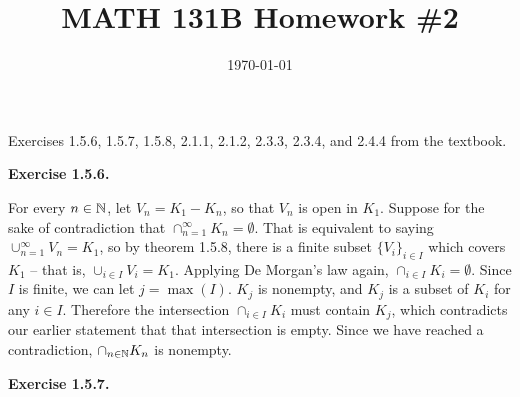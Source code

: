 \documentclass{article}
\date{\today}
\title{MATH 131B Homework \#2}
\begin{document}
\maketitle

\begin{prob}
    Exercises 1.5.6, 1.5.7, 1.5.8, 2.1.1, 2.1.2, 2.3.3, 2.3.4, and 2.4.4 from the textbook.
\end{prob}
\textbf{Exercise 1.5.6.}
\par
For every $n \in \mathbb{N}$, let $V_n = K_1 - K_n$, so that $V_n$ is open in $K_1$. Suppose for the sake of contradiction that $\cap_{n=1}^\infty K_n = \emptyset$. That is equivalent to saying $\cup_{n=1}^\infty V_n = K_1$, so by theorem 1.5.8, there is a finite subset $\{ V_i \}_{i \in I}$ which covers $K_1$ -- that is, $\cup_{i\in I} V_i = K_1$. Applying De Morgan's law again, $\cap_{i \in I} K_i = \emptyset$. Since $I$ is finite, we can let $j = \max(I)$. $K_j$ is nonempty, and $K_j$ is a subset of $K_i$ for any $i \in I$. Therefore the intersection $\cap_{i \in I} K_i$ must contain $K_j$, which contradicts our earlier statement that that intersection is empty. Since we have reached a contradiction, $\cap_{n \in \mathbb{N}} K_n$ is nonempty.
\bigskip
\par
\textbf{Exercise 1.5.7.}
\end{document}
